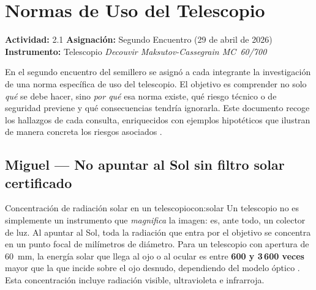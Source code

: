\documentclass[12pt,oneside]{book}
\begin{document}
\frontmatter
\tableofcontents
\clearpage

\clearpage
\hypersetup{pageanchor=true}
\mainmatter

\chapter{Normas de Uso del Telescopio}

\begin{destacado}
    \textbf{Actividad:} 2.1 \quad
    \textbf{Asignación:} Segundo Encuentro (29 de abril de 2026) \quad
    \textbf{Instrumento:} Telescopio \textit{Decouvir Maksutov-Cassegrain MC~60/700}
\end{destacado}

\medskip

En el segundo encuentro del semillero se asignó a cada integrante la investigación
de una norma específica de uso del telescopio. El objetivo es comprender no solo
\emph{qué} se debe hacer, sino \emph{por qué} esa norma existe, qué riesgo técnico
o de seguridad previene y qué consecuencias tendría ignorarla. Este documento recoge
los hallazgos de cada consulta, enriquecidos con ejemplos hipotéticos que ilustran
de manera concreta los riesgos asociados \cite{suiter1994,thompson2005,rutten1988}.

\section{Miguel — No apuntar al Sol sin filtro solar certificado}

\begin{concepto}{Concentración de radiación solar en un telescopio}{con:solar}
    Un telescopio no es simplemente un instrumento que \emph{magnifica} la imagen:
    es, ante todo, un colector de luz. Al apuntar al Sol, toda la radiación que
    entra por el objetivo se concentra en un punto focal de milímetros de diámetro.
    Para un telescopio con apertura de 60~mm, la energía solar que llega al ojo
    o al ocular es entre \textbf{600 y 3\,600 veces} mayor que la que incide sobre
    el ojo desnudo, dependiendo del modelo óptico \cite{pasachoff2000}. Esta
    concentración incluye radiación visible, ultravioleta e infrarroja.
\end{concepto}
\end{document}
